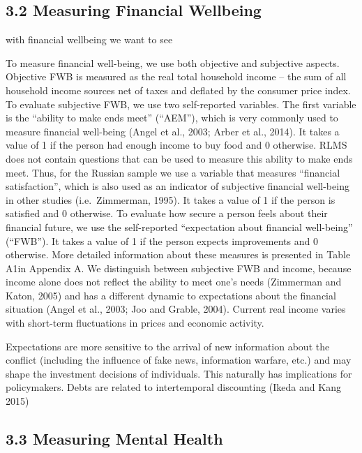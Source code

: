 \documentclass[
  letterpaper,
  DIV=11,
  numbers=noendperiod]{scrartcl}
\begin{document}
\hypertarget{measuring-financial-wellbeing}{%
\subsection{3.2 Measuring Financial
Wellbeing}\label{measuring-financial-wellbeing}}

with financial wellbeing we want to see

To measure financial well-being, we use both objective and subjective
aspects. Objective FWB is measured as the real total household income --
the sum of all household income sources net of taxes and deflated by the
consumer price index. To evaluate subjective FWB, we use two
self-reported variables. The first variable is the ``ability to make
ends meet'' (``AEM''), which is very commonly used to measure financial
well-being (Angel et al., 2003; Arber et al., 2014). It takes a value of
1 if the person had enough income to buy food and 0 otherwise. RLMS does
not contain questions that can be used to measure this ability to make
ends meet. Thus, for the Russian sample we use a variable that measures
``financial satisfaction'', which is also used as an indicator of
subjective financial well-being in other studies (i.e.~Zimmerman, 1995).
It takes a value of 1 if the person is satisfied and 0 otherwise. To
evaluate how secure a person feels about their financial future, we use
the self-reported ``expectation about financial well-being'' (``FWB'').
It takes a value of 1 if the person expects improvements and 0
otherwise. More detailed information about these measures is presented
in Table A1in Appendix A. We distinguish between subjective FWB and
income, because income alone does not reflect the ability to meet one's
needs (Zimmerman and Katon, 2005) and has a different dynamic to
expectations about the financial situation (Angel et al., 2003; Joo and
Grable, 2004). Current real income varies with short-term fluctuations
in prices and economic activity.

Expectations are more sensitive to the arrival of new information about
the conflict (including the influence of fake news, information warfare,
etc.) and may shape the investment decisions of individuals. This
naturally has implications for policymakers. Debts are related to
intertemporal discounting (Ikeda and Kang 2015)

\hypertarget{measuring-mental-health}{%
\subsection{3.3 Measuring Mental Health}\label{measuring-mental-health}}
\end{document}
